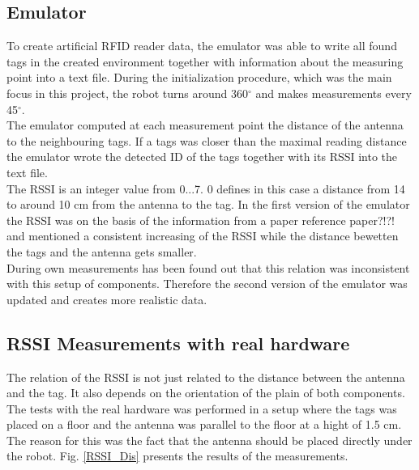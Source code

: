 \subsection{Emulator}
To create artificial RFID reader data, the emulator was able to write all found tags in the created environment together with information about the measuring point into a text file. During the initialization procedure, which was the main focus in this project, the robot turns around 360$^\circ$ and makes measurements every 45$^\circ$. \\
The emulator computed at each measurement point the distance of the antenna to the neighbouring tags. If a tags was closer than the maximal reading distance the emulator wrote the detected ID of the tags together with its RSSI into the text file. \\
The RSSI is an integer value from 0...7. 0 defines in this case a distance from 14 to around 10 cm from the antenna to the tag. In the first version of the emulator the RSSI was on the basis of the information from a paper {\color{red}reference paper?!?!} and mentioned a consistent increasing of the RSSI while the distance bewetten the tags and the antenna gets smaller. \\
During own measurements has been found out that this relation was inconsistent with this setup of components. Therefore the second version of the emulator was updated and creates more realistic data.\\

\subsection{RSSI Measurements with real hardware}
The relation of the RSSI is not just related to the distance between the antenna and the tag. It also depends on the orientation of the plain of both components. The tests with the real hardware was performed in a setup where the tags was placed on a floor and the antenna was parallel to the floor at a hight of 1.5 cm. The reason for this was the fact that the antenna should be placed directly under the robot. Fig. \ref{RSSI_Dis} presents the results of the measurements.


